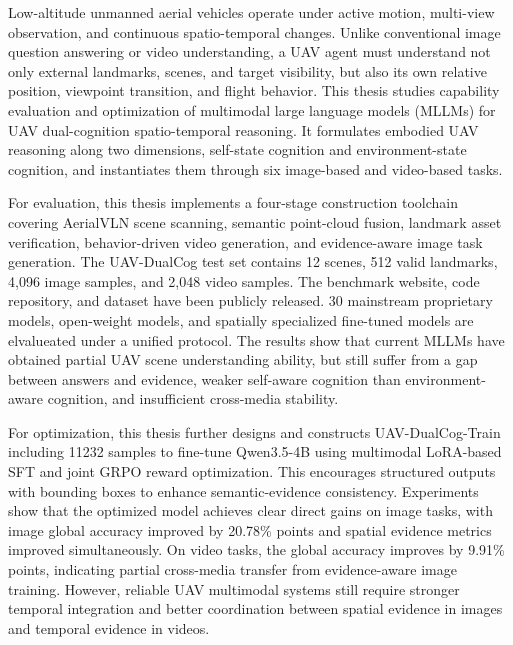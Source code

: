\begin{engabstract}
    Low-altitude unmanned aerial vehicles operate under active motion, multi-view observation, and continuous spatio-temporal changes. Unlike conventional image question answering or video understanding, a UAV agent must understand not only external landmarks, scenes, and target visibility, but also its own relative position, viewpoint transition, and flight behavior. This thesis studies capability evaluation and optimization of multimodal large language models (MLLMs) for UAV dual-cognition spatio-temporal reasoning. It formulates embodied UAV reasoning along two dimensions, self-state cognition and environment-state cognition, and instantiates them through six image-based and video-based tasks.

    For evaluation, this thesis implements a four-stage construction toolchain covering AerialVLN scene scanning, semantic point-cloud fusion, landmark asset verification, behavior-driven video generation, and evidence-aware image task generation. The UAV-DualCog test set contains 12 scenes, 512 valid landmarks, 4,096 image samples, and 2,048 video samples. The benchmark website, code repository, and dataset have been publicly released. 30 mainstream proprietary models, open-weight models, and spatially specialized fine-tuned models are elvalueated under a unified protocol. The results show that current MLLMs have obtained partial UAV scene understanding ability, but still suffer from a gap between answers and evidence, weaker self-aware cognition than environment-aware cognition, and insufficient cross-media stability.

    For optimization, this thesis further designs and constructs UAV-DualCog-Train including 11232 samples to fine-tune Qwen3.5-4B using multimodal LoRA-based SFT and joint GRPO reward optimization. This encourages structured outputs with bounding boxes to enhance semantic-evidence consistency. Experiments show that the optimized model achieves clear direct gains on image tasks, with image global accuracy improved by 20.78\% points and spatial evidence metrics improved simultaneously. On video tasks, the global accuracy improves by 9.91\% points, indicating partial cross-media transfer from evidence-aware image training. However, reliable UAV multimodal systems still require stronger temporal integration and better coordination between spatial evidence in images and temporal evidence in videos.
\end{engabstract}
